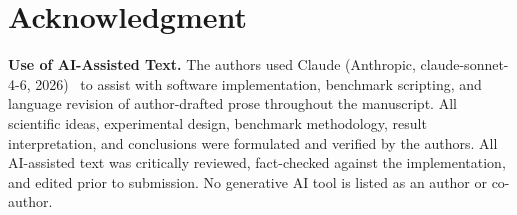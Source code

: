 \documentclass[conference]{IEEEtran}
\begin{document}
\section*{Acknowledgment}


\textbf{Use of AI-Assisted Text.}
The authors used Claude (Anthropic, claude-sonnet-4-6,
2026)~\cite{claude2026} to assist with software implementation,
benchmark scripting, and language revision of author-drafted prose
throughout the manuscript. All scientific ideas, experimental design,
benchmark methodology, result interpretation, and conclusions were
formulated and verified by the authors. All AI-assisted text was critically
reviewed, fact-checked against the implementation, and edited prior to
submission. No generative AI tool is listed as an author or co-author.


\end{document}
